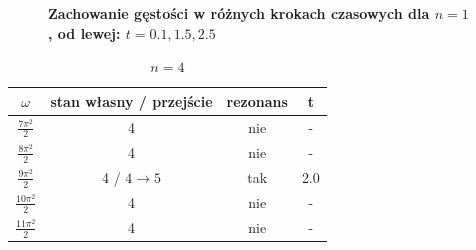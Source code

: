 \documentclass[11pt,a4paper]{article}
\begin{document}
\begin{figure}[ht!]
\begin{multicols}{3}
    \end{multicols}
    \caption{\textbf{Zachowanie gęstości w różnych krokach czasowych dla $n=1$, od lewej: $t=0.1,1.5,2.5$}}
\end{figure}
\pagebreak

\begin{table}[h!]
\vspace{1.5cm}
\begin{center}
\begin{tabular}{|| c | c | c | c ||}
    \hline
    $\omega$ & stan własny / przejście & rezonans & t\\
    \hline
    $\frac{7\pi^2}{2}$ & 4 & nie & -\\
    \hline
    $\frac{8\pi^2}{2}$ & 4 & nie & -\\
    \hline
    $\frac{9\pi^2}{2}$ & 4 / $4\rightarrow5$ & tak & 2.0\\
    \hline
    $\frac{10\pi^2}{2}$ & 4 & nie & -\\
    \hline
    $\frac{11\pi^2}{2}$ & 4 & nie & -\\
    \hline
\end{tabular}
\caption{$n=4$}
\end{center}
\end{table}
\end{document}
